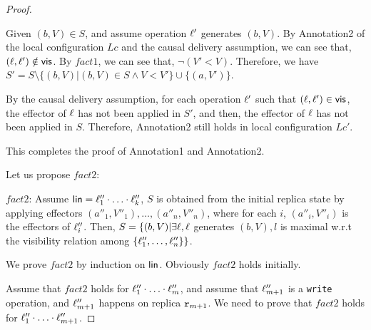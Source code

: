 \begin {proof}
\begin{itemize}
    Given $(b,V) \in S$, and assume operation $\ell'$ generates $(b,V)$. By Annotation2 of the local configuration $Lc$ and the causal delivery assumption, we can see that, $(\ell,\ell') \notin \mathsf{vis}$. By $fact1$, we can see that, $\neg (V' < V)$. Therefore, we have $S' = S \setminus \{ (b,V) \vert (b,V) \in S \wedge V < V' \} \cup \{ (a,V') \}$.

    By the causal delivery assumption, for each operation $\ell'$ such that $(\ell,\ell') \in \mathsf{vis}$, the effector of $\ell$ has not been applied in $S'$, and then, the effector of $\ell$ has not been applied in $S$. Therefore, Annotation2 still holds in local configuration $Lc'$. %

\end{itemize}

This completes the proof of Annotation1 and Annotation2.


Let us propose $fact2$:

\noindent $fact2$: Assume $\mathsf{lin} = \ell''_1 \cdot \ldots \cdot \ell''_k$, $S$ is obtained from the initial replica state by applying effectors $(a''_1,V''_1),\ldots,(a''_n,V''_n)$, where for each $i$, $(a''_i,V''_i)$ is the effectors of $\ell''_i$. Then, $S = \{ (b,V) \vert \exists \ell, \ell$ generates $(b,V), l$ is maximal w.r.t the visibility relation among $ \{ \ell''_1,\ldots,\ell''_n \} \}$.



We prove $fact2$ by induction on $\mathsf{lin}$. Obviously $fact2$ holds initially.

Assume that $fact2$ holds for $\ell''_1 \cdot \ldots \cdot \ell''_m$, and assume that $\ell''_{m+1}$ is a {\tt write} operation, and $\ell''_{m+1}$ happens on replica $\mathtt{r}_{m+1}$. We need to prove that $fact2$ holds for $\ell''_1 \cdot \ldots \cdot \ell''_{m+1}$.


\end{proof}

